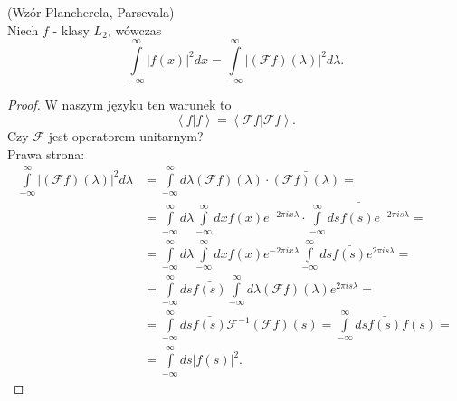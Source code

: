 \documentclass[../main.tex]{subfiles}
\begin{document}
    \pagebreak
    \begin{tw}
        (Wzór Plancherela, Parsevala)\\
        Niech $f$ - klasy $L_2$, wówczas
        \[
            \int\limits_{-\infty}^{\infty} \left| f(x) \right| ^2 dx = \int\limits_{-\infty}^{\infty} \left| \left( \mathcal{F}f \right) (\lambda) \right| ^2 d \lambda
        .\]
    \end{tw}
    \begin{proof}
        W naszym języku ten warunek to
        \[
            \left<f|f \right> = \left<\mathcal{F}f | \mathcal{F}f \right>
        .\]
    Czy $\mathcal{F}$ jest operatorem unitarnym?\\
        Prawa strona:
        \begin{align*}
            \int\limits_{-\infty}^{\infty} \left|\left(\mathcal{F}f\right)(\lambda)\right|^2d\lambda &= \int\limits_{-\infty}^{\infty} d\lambda \left( \mathcal{F}f \right) (\lambda)\cdot \bar{(\mathcal{F}f)(\lambda)} =\\
            &=\int\limits_{-\infty}^{\infty} d\lambda \int\limits_{-\infty}^{\infty} dx f(x) e^{-2\pi i x \lambda} \cdot \bar{\int\limits_{-\infty}^{\infty} ds f(s) e^{-2\pi i s \lambda}} = \\
            &= \int\limits_{-\infty}^{\infty} d\lambda \int\limits_{-\infty}^{\infty} dx f(x) e^{-2\pi i x \lambda}\int\limits_{-\infty}^{\infty} ds \bar{f(s)}e^{2\pi i s \lambda} = \\
            &= \int\limits_{-\infty}^{\infty} ds \bar{f(s)}\int\limits_{-\infty}^{\infty} d\lambda (\mathcal{F}f)(\lambda)e^{2\pi i s \lambda} = \\
            &= \int\limits_{-\infty}^{\infty} ds \bar{f(s)} \mathcal{F}^{-1}(\mathcal{F}f)(s) = \int\limits_{-\infty}^{\infty} ds \bar{f(s)} f(s) = \\
            &= \int\limits_{-\infty}^{\infty} ds \left| f(s) \right| ^2
        .\end{align*}
    \end{proof}
\end{document}
